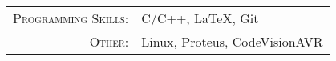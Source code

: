 
\renewcommand{\arraystretch}{1.1}

\begin{tabular}{>{}r>{}p{13cm}}
	\textsc{Programming Skills:}            & C/C++, \LaTeX, Git                                                               \\
	\textsc{Other:}                         & Linux, Proteus, CodeVisionAVR
\end{tabular}